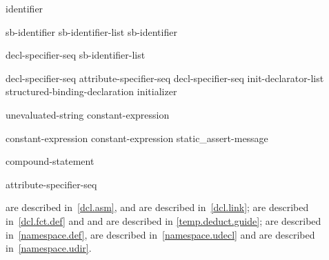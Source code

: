 \begin{bnf}
\br
     identifier 
\end{bnf}

\begin{bnf}
\br
    sb-identifier\br
    sb-identifier-list \terminal{,} sb-identifier
\end{bnf}

\begin{bnf}
\br
     decl-specifier-seq  \terminal{[} sb-identifier-list \terminal{]}
\end{bnf}

\begin{bnf}
\br
    decl-specifier-seq  \terminal{;}\br
    attribute-specifier-seq decl-specifier-seq init-declarator-list \terminal{;}\br
    structured-binding-declaration initializer \terminal{;}
\end{bnf}

\begin{bnf}
\br
  unevaluated-string\br
  constant-expression
\end{bnf}

\begin{bnf}
\br
   \terminal{(} constant-expression \terminal{)} \terminal{;}\br
   \terminal{(} constant-expression \terminal{,} static_assert-message \terminal{)} \terminal{;}
\end{bnf}

\begin{bnf}
\br
   compound-statement
\end{bnf}

\begin{bnf}
\br
    \terminal{;}
\end{bnf}

\begin{bnf}
\br
    attribute-specifier-seq \terminal{;}
\end{bnf}

\begin{note}
 are described in~\ref{dcl.asm}, and
 are described in~\ref{dcl.link};
 are described in~\ref{dcl.fct.def} and
 and
 are described in \ref{temp.deduct.guide};
 are described in~\ref{namespace.def},
 are described in~\ref{namespace.udecl} and
 are described in~\ref{namespace.udir}.
\end{note}

